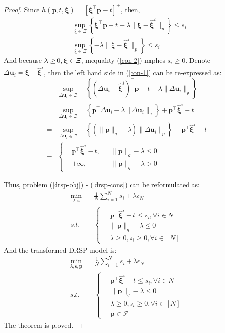 \documentclass{article}
\begin{document}
\begin{proof}
	Since $h(\bm{p}, t, \bm{\xi}) = [\bm{\xi}^\top\bm{p} - t]^+ $, then,
	\begin{align}
		& \sup_{\bm{\xi} \in \Xi} \left\{\bm{\xi}^\top \bm{p} - t - \lambda \|\bm{\xi} - \hat{\bm{\xi}}^i \|_p \right\} \leq s_i \label{con-1} \\
		& \sup_{\bm{\xi} \in \Xi} \left\{-\lambda \|\bm{\xi} - \hat{\bm{\xi}}^i \|_p \right\} \leq s_i \label{con-2}
	\end{align}
	And because $ \lambda \geq 0, \bm{\xi} \in \Xi$, inequality (\ref{con-2}) implies $s_i \geq 0$. Denote $\Delta \bm{u}_i = \bm{\xi} - \hat{\bm{\xi}}^i$, then the left hand side in (\ref{con-1}) can be re-expressed as:
	\begin{align}
		& \sup_{\Delta \bm{u}_i \in \Xi} \quad \left\{(\Delta \bm{u}_i + \hat{\bm{\xi}}^i)^\top\bm{p} - t - \lambda \|\Delta \bm{u}_i \|_p\right\} \\
		= & \sup_{\Delta \bm{u}_i \in \Xi} \quad \left\{ \bm{p}^\top\Delta \bm{u}_i - \lambda  \|\Delta \bm{u}_i \|_p   \right\} + \bm{p}^\top \hat{\bm{\xi}}^i  - t \\
		= & \sup_{\Delta \bm{u}_i \in \Xi} \quad \left\{ (\|\bm{p} \|_q - \lambda) \|\Delta \bm{u}_i\|_p \right\} + \bm{p}^\top \hat{\bm{\xi}}^i  - t \\
		= & \left\{
		\begin{aligned}
			& \bm{p}^\top \hat{\bm{\xi}}^i  - t, && \|\bm{p} \|_q - \lambda \leq 0 \\
			& +\infty, &&  \|\bm{p} \|_q - \lambda > 0
		\end{aligned} \right.
	\end{align}
	
	Thus, problem (\ref{drsp-obj}) - (\ref{drsp-cons}) can be reformulated as:
	\begin{align}
		\min_{\lambda, \bm{s}} \quad & \frac{1}{N} \sum_{i=1}^{N} s_i + \lambda \epsilon_N \\
		s.t. \quad & \left\{
		\begin{aligned}
			\ & \bm{p}^\top \hat{\bm{\xi}}^i  - t \leq s_i, \forall i \in {N} \\
			& \|\bm{p} \|_q - \lambda \leq 0 \\
			& \lambda \geq 0, s_i \geq 0, \forall i \in [N]
		\end{aligned}\right. 
	\end{align}
	And the transformed DRSP model is:
	\begin{align}
		\min_{\lambda, \bm{s}, \bm{p}} \quad & \frac{1}{N} \sum_{i=1}^{N} s_i + \lambda \epsilon_N \\
		s.t. \quad & \left\{
		\begin{aligned}
			\ & \bm{p}^\top \hat{\bm{\xi}}^i  - t \leq s_i, \forall i \in {N} \\
			& \|\bm{p} \|_q - \lambda \leq 0 \\
			& \lambda \geq 0, s_i \geq 0, \forall i \in [N] \\
			& \bm{p} \in \mathcal{P}
		\end{aligned}\right. 
	\end{align}
	The theorem is proved.
\end{proof}
\end{document}
